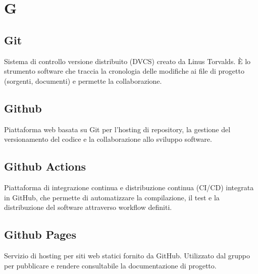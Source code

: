 \documentclass[a4paper, 11pt, oneside]{scrartcl} %
\begin{document}

\section*{G}


\subsection*{Git}


Sistema di controllo versione distribuito (DVCS) creato da Linus Torvalds.
È lo strumento software che traccia la cronologia delle modifiche ai file di progetto (sorgenti, documenti) e permette la collaborazione.

\vspace{0.5cm}

\subsection*{Github}


Piattaforma web basata su Git per l'hosting di repository, la gestione del versionamento del codice e la collaborazione allo sviluppo software.

\vspace{0.5cm}

\subsection*{Github Actions}
Piattaforma di integrazione continua e distribuzione continua (CI/CD) integrata in GitHub, che permette di automatizzare la compilazione, il test e la distribuzione del software attraverso workflow definiti.
\vspace{0.5cm}

\subsection*{Github Pages}


Servizio di hosting per siti web statici fornito da GitHub. Utilizzato dal gruppo per pubblicare e rendere consultabile la documentazione di progetto.
\end{document}
